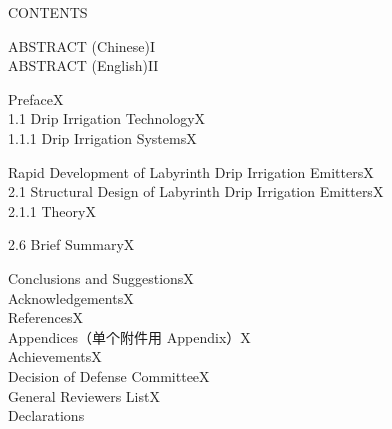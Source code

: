 \documentclass[UTF8, scheme=chinese, openany, oneside]{ctexbook}
\renewcommand{\headrulewidth}{0.4pt}
\renewcommand{\headrulewidth}{0.4pt}
\renewcommand{\headrulewidth}{0.4pt}
\renewcommand{\headrulewidth}{0.4pt}
\renewcommand{\headrulewidth}{0.4pt}
\renewcommand{\headrulewidth}{0.4pt}
\renewcommand{\headrulewidth}{0.6pt}
\renewcommand{\headrulewidth}{0.6pt}
\begin{document}
\pagestyle{fancy}
\fancyhf{}
\renewcommand{\headrulewidth}{0.75pt}

\begin{center}
    \vspace*{0.2cm}
    {\sffamily CONTENTS}
\end{center}
\vspace{1cm} %

\noindent ABSTRACT (Chinese)\dotfill I \\
\noindent ABSTRACT (English)\dotfill II 

\vspace{\baselineskip} %

\quad Preface\dotfill X \\
\noindent \hspace*{2em}1.1 Drip Irrigation Technology\dotfill X \\
\noindent \hspace*{4em}1.1.1 Drip Irrigation Systems\dotfill X 

\vspace{\baselineskip} %

\quad Rapid Development of Labyrinth Drip Irrigation Emitters\dotfill X \\
\noindent \hspace*{2em}2.1 Structural Design of Labyrinth Drip Irrigation Emitters\dotfill X \\
\noindent \hspace*{4em}2.1.1 Theory\dotfill X 

\vspace{1.5\baselineskip} %

\noindent \hspace*{2em}2.6 Brief Summary\dotfill X 

\vspace{5\baselineskip} %

\quad Conclusions and Suggestions\dotfill X \\
\noindent Acknowledgements\dotfill X \\
\noindent References\dotfill X \\
\noindent Appendices（单个附件用 Appendix）\dotfill X \\
\noindent Achievements\dotfill X \\
\noindent Decision of Defense Committee\dotfill X \\
\noindent General Reviewers List\dotfill X \\
\noindent Declarations %
\end{document}
